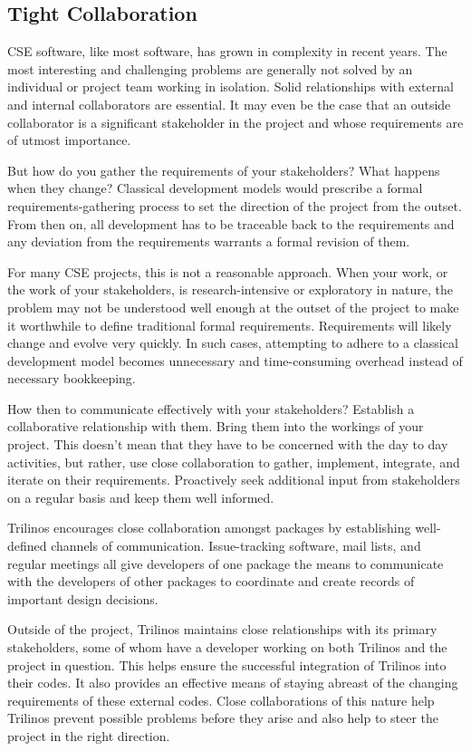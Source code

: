\documentclass{doublecol}
\begin{document}
\subsection{Tight Collaboration}

CSE software, like most software, has grown in complexity in recent
years. The most interesting and challenging problems are generally
not solved by an individual or project team working in isolation.
Solid relationships with external and internal collaborators are
essential.  It may even be the case that an outside collaborator is
a significant stakeholder in the project and whose requirements are
of utmost importance.

But how do you gather the requirements of your stakeholders?  What
happens when they change?  Classical development models would
prescribe a formal requirements-gathering process to set the
direction of the project from the outset.  From then on, all
development has to be traceable back to the requirements and any
deviation from the requirements warrants a formal revision of them.

For many CSE projects, this is not a reasonable approach.  When your
work, or the work of your stakeholders, is research-intensive or
exploratory in nature, the problem may not be understood well enough
at the outset of the project to make it worthwhile to define
traditional formal requirements.  Requirements will likely change
and evolve very quickly.  In such cases, attempting to adhere to a
classical development model becomes unnecessary and time-consuming
overhead instead of necessary bookkeeping.

How then to communicate effectively with your stakeholders?
Establish a collaborative relationship with them.  Bring them into
the workings of your project.  This doesn't mean that they have to
be concerned with the day to day activities, but rather, use close
collaboration to gather, implement, integrate, and iterate on their
requirements.  Proactively seek additional input from stakeholders
on a regular basis and keep them well informed.

Trilinos encourages close collaboration amongst packages by
establishing well-defined channels of communication.  Issue-tracking
software, mail lists, and regular meetings all give developers of
one package the means to communicate with the developers of other 
packages to coordinate and create records of important design decisions.

Outside of the project, Trilinos maintains close relationships with
its primary stakeholders, some of whom have a developer working on
both Trilinos and the project in question.  This helps ensure the
successful integration of Trilinos into their codes.  It also
provides an effective means of staying abreast of the changing
requirements of these external codes.  Close collaborations of this
nature help Trilinos prevent possible problems before they arise and
also help to steer the project in the right direction.
\end{document}
